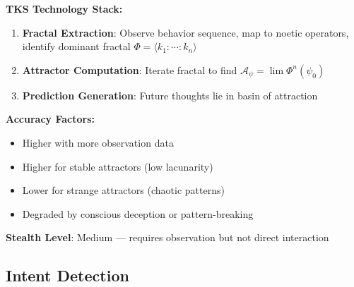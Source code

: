 \documentclass[11pt,twoside]{book}
\newcommand{\Frac}{\Phi}
\newcommand{\PsychAttractor}{\mathcal{A}_\psi}
\begin{document}
\begin{tcolorbox}[colback=yellow!5!white,colframe=yellow!65!black,title=\textbf{Thought Prediction Capability}]
\textbf{TKS Technology Stack:}
\begin{enumerate}
    \item \textbf{Fractal Extraction}: Observe behavior sequence, map to noetic operators,
          identify dominant fractal $\Frac = \langle k_1 : \cdots : k_n \rangle$
    \item \textbf{Attractor Computation}: Iterate fractal to find $\PsychAttractor = \lim \Frac^n(\psi_0)$
    \item \textbf{Prediction Generation}: Future thoughts lie in basin of attraction
\end{enumerate}

\textbf{Accuracy Factors:}
\begin{itemize}
    \item Higher with more observation data
    \item Higher for stable attractors (low lacunarity)
    \item Lower for strange attractors (chaotic patterns)
    \item Degraded by conscious deception or pattern-breaking
\end{itemize}

\textbf{Stealth Level}: Medium --- requires observation but not direct interaction
\end{tcolorbox}

\subsection{Intent Detection}
\end{document}
